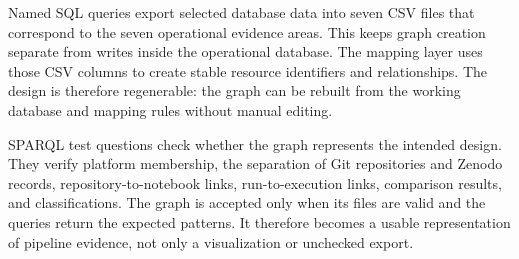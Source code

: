 Named SQL queries export selected database data into seven CSV files that correspond to the seven operational evidence areas. This keeps graph creation separate from writes inside the operational database. The mapping layer uses those CSV columns to create stable resource identifiers and relationships. The design is therefore regenerable: the graph can be rebuilt from the working database and mapping rules without manual editing.

SPARQL test questions check whether the graph represents the intended design. They verify platform membership, the separation of Git repositories and Zenodo records, repository-to-notebook links, run-to-execution links, comparison results, and classifications. The graph is accepted only when its files are valid and the queries return the expected patterns. It therefore becomes a usable representation of pipeline evidence, not only a visualization or unchecked export.

